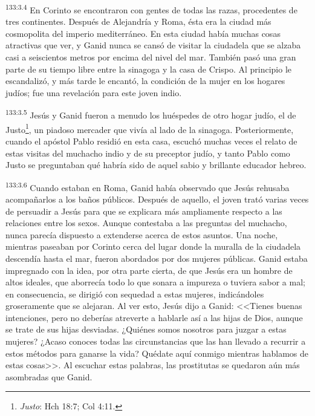 \par 
\textsuperscript{133:3.4} En Corinto se encontraron con gentes de todas las razas, procedentes de tres continentes. Después de Alejandría y Roma, ésta era la ciudad más cosmopolita del imperio mediterráneo. En esta ciudad había muchas cosas atractivas que ver, y Ganid nunca se cansó de visitar la ciudadela que se alzaba casi a seiscientos metros por encima del nivel del mar. También pasó una gran parte de su tiempo libre entre la sinagoga y la casa de Crispo. Al principio le escandalizó, y más tarde le encantó, la condición de la mujer en los hogares judíos; fue una revelación para este joven indio.

\par 
\textsuperscript{133:3.5} Jesús y Ganid fueron a menudo los huéspedes de otro hogar judío, el de Justo\footnote{\textit{Justo}: Hch 18:7; Col 4:11.}, un piadoso mercader que vivía al lado de la sinagoga. Posteriormente, cuando el apóstol Pablo residió en esta casa, escuchó muchas veces el relato de estas visitas del muchacho indio y de su preceptor judío, y tanto Pablo como Justo se preguntaban qué habría sido de aquel sabio y brillante educador hebreo.

\par 
\textsuperscript{133:3.6} Cuando estaban en Roma, Ganid había observado que Jesús rehusaba acompañarlos a los baños públicos. Después de aquello, el joven trató varias veces de persuadir a Jesús para que se explicara más ampliamente respecto a las relaciones entre los sexos. Aunque contestaba a las preguntas del muchacho, nunca parecía dispuesto a extenderse acerca de estos asuntos. Una noche, mientras paseaban por Corinto cerca del lugar donde la muralla de la ciudadela descendía hasta el mar, fueron abordados por dos mujeres públicas. Ganid estaba impregnado con la idea, por otra parte cierta, de que Jesús era un hombre de altos ideales, que aborrecía todo lo que sonara a impureza o tuviera sabor a mal; en consecuencia, se dirigió con sequedad a estas mujeres, indicándoles groseramente que se alejaran. Al ver esto, Jesús dijo a Ganid: <<Tienes buenas intenciones, pero no deberías atreverte a hablarle así a las hijas de Dios, aunque se trate de sus hijas desviadas. ¿Quiénes somos nosotros para juzgar a estas mujeres? ¿Acaso conoces todas las circunstancias que las han llevado a recurrir a estos métodos para ganarse la vida? Quédate aquí conmigo mientras hablamos de estas cosas>>. Al escuchar estas palabras, las prostitutas se quedaron aún más asombradas que Ganid.

